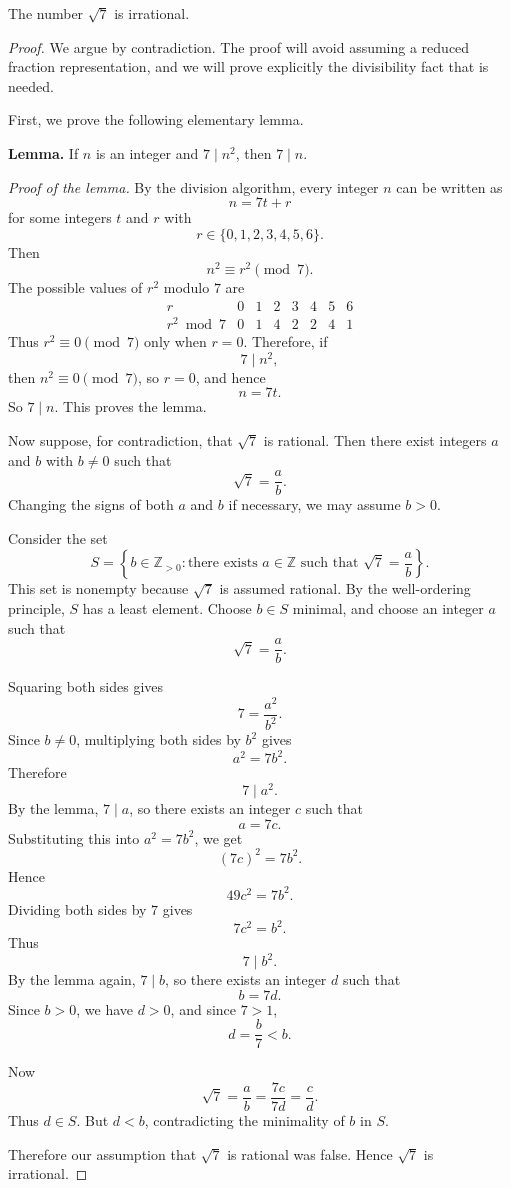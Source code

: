 \begin{theorem}
The number $\sqrt{7}$ is irrational.
\end{theorem}

\begin{proof}
We argue by contradiction. The proof will avoid assuming a reduced fraction
representation, and we will prove explicitly the divisibility fact that is needed.

First, we prove the following elementary lemma.

\medskip

\noindent\textbf{Lemma.} If $n$ is an integer and $7 \mid n^2$, then $7 \mid n$.

\smallskip

\noindent\textit{Proof of the lemma.}
By the division algorithm, every integer $n$ can be written as
\[
n=7t+r
\]
for some integers $t$ and $r$ with
\[
r \in \{0,1,2,3,4,5,6\}.
\]
Then
\[
n^2 \equiv r^2 \pmod 7.
\]
The possible values of $r^2$ modulo $7$ are
\[
\begin{array}{c|ccccccc}
r & 0 & 1 & 2 & 3 & 4 & 5 & 6 \\ \hline
r^2 \bmod 7 & 0 & 1 & 4 & 2 & 2 & 4 & 1
\end{array}
\]
Thus $r^2 \equiv 0 \pmod 7$ only when $r=0$. Therefore, if
\[
7 \mid n^2,
\]
then $n^2 \equiv 0 \pmod 7$, so $r=0$, and hence
\[
n=7t.
\]
So $7 \mid n$. This proves the lemma.

\medskip

Now suppose, for contradiction, that $\sqrt{7}$ is rational. Then there exist integers
$a$ and $b$ with $b \neq 0$ such that
\[
\sqrt{7}=\frac{a}{b}.
\]
Changing the signs of both $a$ and $b$ if necessary, we may assume $b>0$.

Consider the set
\[
S=\left\{ b \in \mathbb{Z}_{>0} : \text{there exists } a \in \mathbb{Z}
\text{ such that } \sqrt{7}=\frac{a}{b} \right\}.
\]
This set is nonempty because $\sqrt{7}$ is assumed rational. By the well-ordering
principle, $S$ has a least element. Choose $b \in S$ minimal, and choose an integer
$a$ such that
\[
\sqrt{7}=\frac{a}{b}.
\]

Squaring both sides gives
\[
7=\frac{a^2}{b^2}.
\]
Since $b \neq 0$, multiplying both sides by $b^2$ gives
\[
a^2=7b^2.
\]
Therefore
\[
7 \mid a^2.
\]
By the lemma, $7 \mid a$, so there exists an integer $c$ such that
\[
a=7c.
\]
Substituting this into $a^2=7b^2$, we get
\[
(7c)^2=7b^2.
\]
Hence
\[
49c^2=7b^2.
\]
Dividing both sides by $7$ gives
\[
7c^2=b^2.
\]
Thus
\[
7 \mid b^2.
\]
By the lemma again, $7 \mid b$, so there exists an integer $d$ such that
\[
b=7d.
\]
Since $b>0$, we have $d>0$, and since $7>1$,
\[
d=\frac{b}{7}<b.
\]

Now
\[
\sqrt{7}=\frac{a}{b}=\frac{7c}{7d}=\frac{c}{d}.
\]
Thus $d \in S$. But $d<b$, contradicting the minimality of $b$ in $S$.

Therefore our assumption that $\sqrt{7}$ is rational was false. Hence
$\sqrt{7}$ is irrational.
\end{proof}
